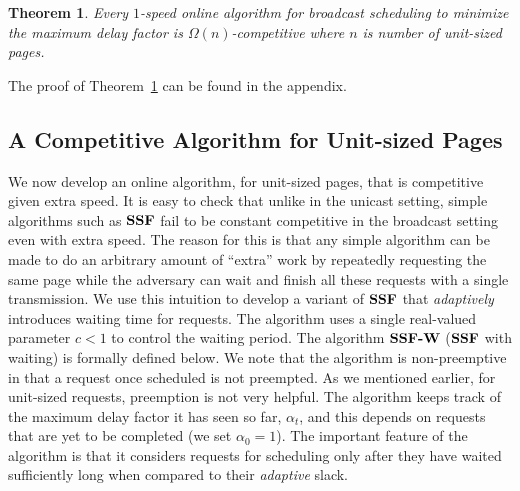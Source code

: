 \documentclass[11pt]{article}
\newtheorem{theorem}[lemma]{Theorem}
\begin{document}
\begin{theorem}
  \label{broadcast-lower} Every $1$-speed online algorithm for broadcast
  scheduling to minimize the maximum delay factor is $\Omega(n)$-competitive
  where $n$ is number of unit-sized pages.
\end{theorem}

The proof of Theorem~\ref{broadcast-lower} can be found in the appendix.

\subsection{A Competitive Algorithm for Unit-sized Pages}
\label{broadcast-single}

We now develop an online algorithm, for unit-sized pages, that is
competitive given extra speed. It is easy to check that unlike in the
unicast setting, simple algorithms such as ${\texttt{\bf{SSF}}}$ fail to be constant
competitive in the broadcast setting even with extra speed. The reason
for this is that any simple algorithm can be made to do an arbitrary
amount of ``extra'' work by repeatedly requesting the same page while
the adversary can wait and finish all these requests with a single
transmission. We use this intuition to develop a variant of ${\texttt{\bf{SSF}}}$
that {\em adaptively} introduces waiting time for requests.  The
algorithm uses a single real-valued parameter $c < 1$ to control the
waiting period. The algorithm ${\texttt{\bf{SSF-W}}}$ (${\texttt{\bf{SSF}}}$ with waiting) is formally
defined below. We note that the algorithm is non-preemptive in that a
request once scheduled is not preempted. As we mentioned earlier, for
unit-sized requests, preemption is not very helpful. The algorithm
keeps track of the maximum delay factor it has seen so far,
$\alpha_t$, and this depends on requests that are yet to be completed
(we set $\alpha_0 = 1$). The important feature of the algorithm is
that it considers requests for scheduling only after they have waited
sufficiently long when compared to their {\em adaptive} slack.
\end{document}
